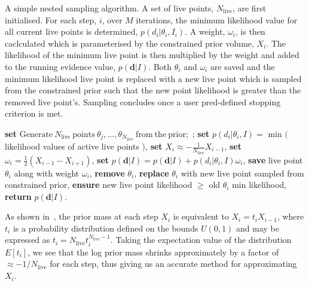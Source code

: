 \begin{algorithm}[hbt!]
\caption[A simple nested sampling algorithm]{A simple nested 
sampling algorithm. A set of live 
points, $N_{\mathrm{live}}$, are first initialised. For each 
step, $i$, over $M$ iterations, the minimum likelihood value 
for all current live points is determined,
$p(d_i|\theta_i,I_i)$. A weight, $\omega_i$, is then 
caclculated which is parameterised by the constrained prior volume, $X_i$. The likelihood of the minimum live point is then multiplied by the weight 
and added to the running evidence value, $p(\bm{d}|I)$. Both 
$\theta_i$ and $\omega_i$ are saved and the minimum likelihood 
live point is replaced with a new live point which is sampled 
from the constrained prior such that the new point likelihood 
is greater than the removed live point's. Sampling concludes 
once a user pred-defined stopping criterion is met.}\label{alg:nested}
\begin{algorithmic}
\State \textbf{set} $\mathrm{Generate} \ N_{\mathrm{live}} \ \mathrm{points} 
\ \theta_j, ..., \theta_{N_\mathrm{live}} \ \mathrm{from \ the \ prior;}$
;
\State \textbf{set} $p(d_i|\theta_i,I) = $ min $($ likelihood values of active live points $)$,
\State \textbf{set} $X_i \approx -\frac{1}{N_{\mathrm{live}}} X_{i-1}$, 
\State \textbf{set} $\omega_i = \frac{1}{2}(X_{i-1} - X_{i+1})$,
\State \textbf{set} $p(\bm{d}|I) = p(\bm{d}|I) + p(d_i|\theta_i,I) \omega_i$,
\State \textbf{save} live point $\theta_i$ along with weight 
$\omega_i$,
\State \textbf{remove} $\theta_i$,
\State \textbf{replace} $\theta_i$ with new live point sampled from 
constrained prior,
\State \textbf{ensure} new live point likelihood $\geq$ old $\theta_i$ min likelihood,
\EndFor
\State \textbf{return} $p(\bm{d}|I)$.
\end{algorithmic}
\end{algorithm}

%
%
As shown in~\cite{skilling2006}, the prior mass at each step 
$X_i$ is equivalent to
$X_i = t_i X_{i-1}$, where $t_i$ is a probability distribution defined on the 
bounds $U(0,1)$ and may be expressed as 
$t_i = N_{\mathrm{live}} t_{i}^{N_{\mathrm{live}} - 1}$. Taking the expectation 
value of the distribution $E[t_i]$, we see that the log prior mass shrinks 
approximately by a factor of $\approx -1/N_{\mathrm{live}}$ for each step, thus 
giving us an accurate method for approximating $X_i$.

